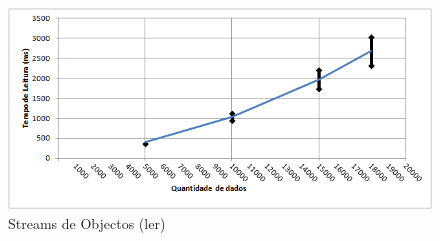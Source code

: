 \documentclass[a5paper,twocolumn, 11pt]{article}
\begin{document}
\begin{figure}[h!b!t!]
    \caption[Streams de Objectos (ler)]{Streams de Objectos (ler)}
    \centering
        \includegraphics[width=400pt]{sdo_2.png}
\end{figure}

\newpage
\twocolumn
\end{document}
